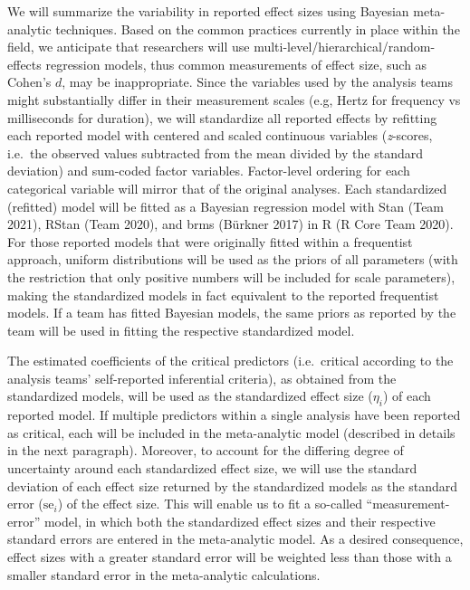 \documentclass[
  12pt,
]{article}
\begin{document}
We will summarize the variability in reported effect sizes using Bayesian meta-analytic techniques.
Based on the common practices currently in place within the field, we anticipate that researchers will use multi-level/hierarchical/random-effects regression models, thus common measurements of effect size, such as Cohen's \(d\), may be inappropriate.
Since the variables used by the analysis teams might substantially differ in their measurement scales (e.g, Hertz for frequency vs milliseconds for duration), we will standardize all reported effects by refitting each reported model with centered and scaled continuous variables (\emph{z}-scores, i.e.~the observed values subtracted from the mean divided by the standard deviation) and sum-coded factor variables.
Factor-level ordering for each categorical variable will mirror that of the original analyses.
Each standardized (refitted) model will be fitted as a Bayesian regression model with Stan (Team 2021), RStan (Team 2020), and brms (Bürkner 2017) in R (R Core Team 2020).
For those reported models that were originally fitted within a frequentist approach, uniform distributions will be used as the priors of all parameters (with the restriction that only positive numbers will be included for scale parameters), making the standardized models in fact equivalent to the reported frequentist models.
If a team has fitted Bayesian models, the same priors as reported by the team will be used in fitting the respective standardized model.

The estimated coefficients of the critical predictors (i.e.~critical according to the analysis teams' self-reported inferential criteria), as obtained from the standardized models, will be used as the standardized effect size (\(\eta_i\)) of each reported model.
If multiple predictors within a single analysis have been reported as critical, each will be included in the meta-analytic model (described in details in the next paragraph).
Moreover, to account for the differing degree of uncertainty around each standardized effect size, we will use the standard deviation of each effect size returned by the standardized models as the standard error (\(\text{se}_i\)) of the effect size.
This will enable us to fit a so-called ``measurement-error'' model, in which both the standardized effect sizes and their respective standard errors are entered in the meta-analytic model.
As a desired consequence, effect sizes with a greater standard error will be weighted less than those with a smaller standard error in the meta-analytic calculations.
\end{document}
